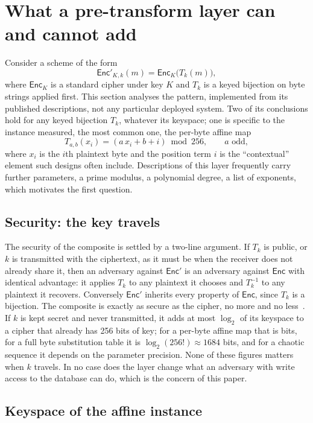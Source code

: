 \section{What a pre-transform layer can and cannot add}
\label{sec:pretransform}

Consider a scheme of the form
\[
\mathsf{Enc}'_{K,k}(m) = \mathsf{Enc}_K\big(T_k(m)\big),
\]
where $\mathsf{Enc}_K$ is a standard cipher under key $K$ and $T_k$ is a keyed bijection on byte strings applied first. This section analyses the pattern, implemented from its published descriptions, not any particular deployed system. Two of its conclusions hold for any keyed bijection $T_k$, whatever its keyspace; one is specific to the instance measured, the most common one, the per-byte affine map
\[
T_{a,b}(x_i) = (a\,x_i + b + i) \bmod 256, \qquad a \text{ odd},
\]
where $x_i$ is the $i$th plaintext byte and the position term $i$ is the ``contextual'' element such designs often include. Descriptions of this layer frequently carry further parameters, a prime modulus, a polynomial degree, a list of exponents, which motivates the first question.

\subsection{Security: the key travels}
\label{sec:security-pre}

The security of the composite is settled by a two-line argument. If $T_k$ is public, or $k$ is transmitted with the ciphertext, as it must be when the receiver does not already share it, then an adversary against $\mathsf{Enc}'$ is an adversary against $\mathsf{Enc}$ with identical advantage: it applies $T_k$ to any plaintext it chooses and $T_k^{-1}$ to any plaintext it recovers. Conversely $\mathsf{Enc}'$ inherits every property of $\mathsf{Enc}$, since $T_k$ is a bijection. The composite is exactly as secure as the cipher, no more and no less~\cite{bellare2000ae}. If $k$ is kept secret and never transmitted, it adds at most $\log_2$ of its keyspace to a cipher that already has 256 bits of key; for a per-byte affine map that is \KeyspaceLog{} bits, for a full byte substitution table it is $\log_2(256!) \approx 1684$ bits, and for a chaotic sequence it depends on the parameter precision. None of these figures matters when $k$ travels. In no case does the layer change what an adversary with write access to the database can do, which is the concern of this paper.

\subsection{Keyspace of the affine instance}


